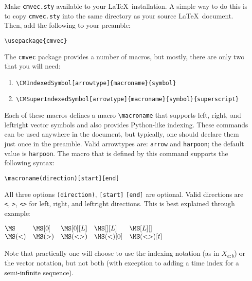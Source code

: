 \documentclass{article}
\begin{document}
\setlength{\parindent}{0pt}

Make \verb+cmvec.sty+ available to your \LaTeX\
installation. A simple way to do this is to copy \verb+cmvec.sty+ into
the same directory as your source \LaTeX\ document. Then, add the following
to your preamble:
\begin{center}
\verb+\usepackage{cmvec}+
\end{center}

The \texttt{cmvec} package provides a number of macros, but mostly, there
are only two that you will need:

\begin{enumerate}
  \item \verb+\CMIndexedSymbol[arrowtype]{macroname}{symbol}+
  \item \verb+\CMSuperIndexedSymbol[arrowtype]{macroname}{symbol}{superscript}+
\end{enumerate}

Each of these macros defines a macro \verb+\macroname+ that supports
left, right, and leftright vector symbols and also provides Python-like
indexing.  These commands can be used anywhere in the document, but typically,
one should declare them just once in the preamble. Valid arrowtypes are:
\verb+arrow+ and \verb+harpoon+; the default value is \verb+harpoon+.
The macro that is defined by this command supports the following syntax:
\begin{center}
\verb+\macroname(direction)[start][end]+
\end{center}
All three options \verb+(direction)+, \verb+[start]+ \verb+[end]+ are
optional. Valid directions are \verb+<+, \verb+>+, \verb+<>+ for left, right,
and leftright directions. This is best explained through example:

\begin{LTXexample}[pos=b]

$\begin{matrix*}[l]
\MS & \MS[0] & \MS[0][L] & \MS[][L] & \MS[L][]\\
\MS(<) & \MS(>) & \MS(<>) & \MS(<)[0] & \MS(<>)[t]
\end{matrix*}$
\end{LTXexample}

Note that practically one will choose to use the indexing notation (as in
$X_{a:b}$) or the vector notation, but not both (with exception to adding a
time index for a semi-infinite sequence).\\
\end{document}
